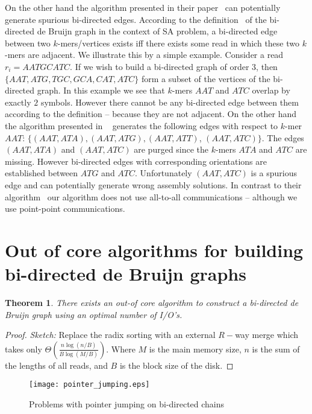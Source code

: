 \documentclass[11pt,conference,twocolumn]{IEEEtran}
\newtheorem{theorem}{Theorem}
\begin{document}
On the other hand the algorithm presented in their paper~\cite{par_bidirected_graph} can potentially 
generate spurious bi-directed edges. According to the definition~\cite{bidirected_graph} of the 
bi-directed de Bruijn graph in the context of SA problem, a bi-directed edge between two $k$-mers/vertices
exists iff there exists some read in which these two $k$-mers are adjacent. We illustrate this by a simple
example. Consider a read $r_i = AATGCATC$. If we wish to build a bi-directed graph of order $3$, then
$\{AAT, ATG, TGC, GCA, CAT, ATC\}$ form a subset of the vertices of the bi-directed graph. In this example
we see that $k$-mers $AAT$ and $ATC$ overlap by exactly $2$ symbols. However there cannot be any 
bi-directed edge between them according to the definition -- because they are not adjacent. On the other hand
the algorithm presented in ~\cite{par_bidirected_graph} generates the following edges with respect
to $k$-mer $AAT$: $\{(AAT,ATA), (AAT,ATG), (AAT,ATT)$, $(AAT,ATC) \}$. The edges $(AAT, ATA)$ and $(AAT, ATC)$
are purged since the $k$-mers $ATA$ and $ATC$ are missing. However bi-directed edges with corresponding orientations
are established between $ATG$ and $ATC$. Unfortunately $(AAT, ATC)$ is a spurious edge and can potentially
generate wrong assembly solutions. In contrast to their algorithm~\cite{par_bidirected_graph} our algorithm 
does not use all-to-all communications -- although we use point-point communications.

\section{Out of core algorithms for building bi-directed de Bruijn graphs} 
\label{sec:out-of-core}
\begin{theorem}
There exists an out-of core algorithm to construct a bi-directed de Bruijn graph using an optimal number of
I/O's.
\end{theorem}
\begin{proof}
{\em Sketch:} Replace the radix sorting with an external $R-$way merge which takes only 
$\Theta(\frac{n\log(n/B)}{B\log(M/B)})$. Where $M$ is the main memory size, $n$ is the sum 
of the lengths of all reads, and $B$ is the block size of the disk.
\end{proof}

\begin{figure}
\begin{center}
\texttt{[image: pointer\_jumping.eps]}
\end{center}
\caption{Problems with pointer jumping on bi-directed chains}
\label{fig:bi-pointer}
\end{figure}
\end{document}
